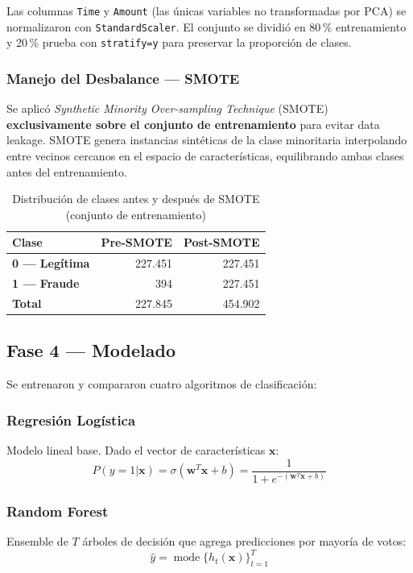 \documentclass[12pt, a4paper]{article}
\begin{document}
Las columnas \texttt{Time} y \texttt{Amount} (las únicas variables no
transformadas por PCA) se normalizaron con \texttt{StandardScaler}. El
conjunto se dividió en 80\,\% entrenamiento y 20\,\% prueba con
\texttt{stratify=y} para preservar la proporción de clases.

\subsubsection{Manejo del Desbalance — SMOTE}

Se aplicó \textit{Synthetic Minority Over-sampling Technique}
(SMOTE) \cite{chawla2002smote} \textbf{exclusivamente sobre el conjunto
de entrenamiento} para evitar data leakage. SMOTE genera instancias
sintéticas de la clase minoritaria interpolando entre vecinos cercanos en
el espacio de características, equilibrando ambas clases antes del
entrenamiento.

\begin{table}[H]
\centering
\caption{Distribución de clases antes y después de SMOTE (conjunto de entrenamiento)}
\begin{tabular}{>{\bfseries}p{4.5cm} r r}
\toprule
Clase & Pre-SMOTE & Post-SMOTE \\
\midrule
0 — Legítima   & 227.451 & 227.451 \\
1 — Fraude     &     394 & 227.451 \\
\midrule
\textbf{Total} & 227.845 & 454.902 \\
\bottomrule
\end{tabular}
\label{tab:smote}
\end{table}

\subsection{Fase 4 — Modelado}

Se entrenaron y compararon cuatro algoritmos de clasificación:

\subsubsection{Regresión Logística}
Modelo lineal base. Dado el vector de características $\mathbf{x}$:
\begin{equation}
P(y=1|\mathbf{x}) = \sigma(\mathbf{w}^T\mathbf{x} + b)
= \frac{1}{1+e^{-(\mathbf{w}^T\mathbf{x}+b)}}
\end{equation}

\subsubsection{Random Forest}
Ensemble de $T$ árboles de decisión que agrega predicciones por mayoría de votos:
\begin{equation}
\hat{y} = \operatorname{mode}\bigl\{h_t(\mathbf{x})\bigr\}_{t=1}^{T}
\end{equation}
\end{document}
